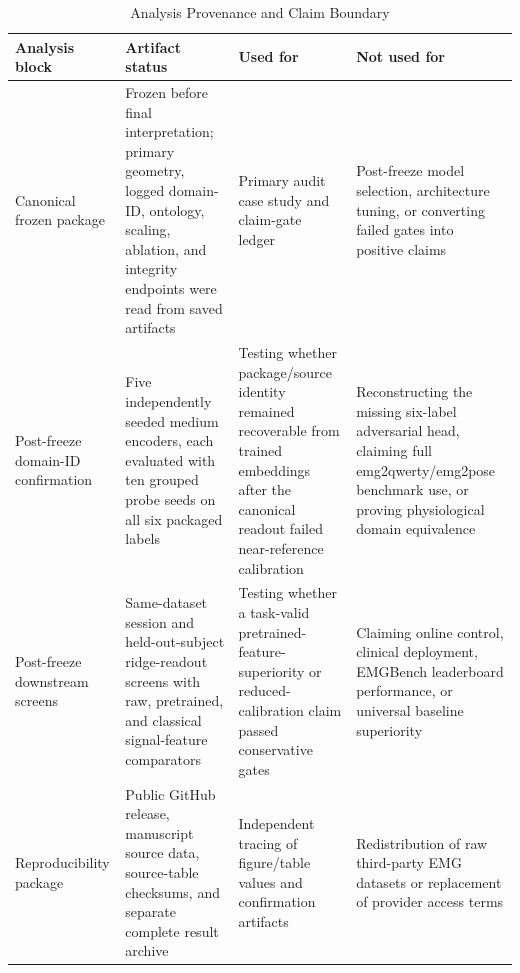 \documentclass[journal]{IEEEtran}
\begin{document}
\begin{table}[t]
\caption{Analysis Provenance and Claim Boundary}
\label{tab:analysisprovenance}
\centering
\footnotesize
\begin{tabularx}{\textwidth}{@{}p{3.1cm}p{4.1cm}p{4.4cm}Y@{}}
\toprule
Analysis block & Artifact status & Used for & Not used for \\
\midrule
Canonical frozen package & Frozen before final interpretation; primary geometry, logged domain-ID, ontology, scaling, ablation, and integrity endpoints were read from saved artifacts & Primary audit case study and claim-gate ledger & Post-freeze model selection, architecture tuning, or converting failed gates into positive claims \\
Post-freeze domain-ID confirmation & Five independently seeded medium encoders, each evaluated with ten grouped probe seeds on all six packaged labels & Testing whether package/source identity remained recoverable from trained embeddings after the canonical readout failed near-reference calibration & Reconstructing the missing six-label adversarial head, claiming full emg2qwerty/emg2pose benchmark use, or proving physiological domain equivalence \\
Post-freeze downstream screens & Same-dataset session and held-out-subject ridge-readout screens with raw, pretrained, and classical signal-feature comparators & Testing whether a task-valid pretrained-feature-superiority or reduced-calibration claim passed conservative gates & Claiming online control, clinical deployment, EMGBench leaderboard performance, or universal baseline superiority \\
Reproducibility package & Public GitHub release, manuscript source data, source-table checksums, and separate complete result archive & Independent tracing of figure/table values and confirmation artifacts & Redistribution of raw third-party EMG datasets or replacement of provider access terms \\
\bottomrule
\end{tabularx}
\end{table}
\end{document}
